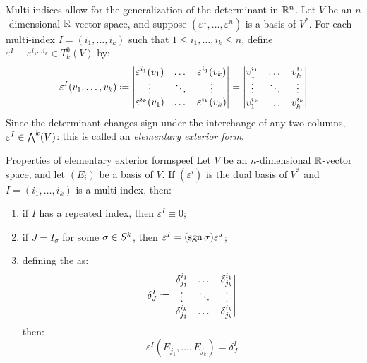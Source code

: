 Multi-indices allow for the generalization of the determinant in $ \mathbb{R}^n $. Let $ V $ be an $ n $-dimensional $ \mathbb{R} $-vector space, and suppose $ (\varepsilon^1 , \dots , \varepsilon^n) $ is a basis of $ V^* $. For each multi-index $ I = (i_1 , \dots , i_k) $ such that $ 1 \leq i_1 , \dots , i_k \leq n $, define $ \varepsilon^I \equiv \varepsilon^{i_1 \dots i_k} \in T^0_k(V) $ by:
\begin{equation}
  \varepsilon^I(v_1 , \dots , v_k) \defeq
  \begin{vmatrix}
    \varepsilon^{i_1}(v_1) & \dots & \varepsilon^{i_1}(v_k) \\
    \vdots & \ddots & \vdots \\
    \varepsilon^{i_k}(v_1) & \dots & \varepsilon^{i_k}(v_k)
  \end{vmatrix}
  =
  \begin{vmatrix}
    v_1^{i_1} & \dots & v_k^{i_1} \\
    \vdots & \ddots & \vdots \\
    v_1^{i_k} & \dots & v_k^{i_k}
  \end{vmatrix}
\end{equation}
Since the determinant changes sign under the interchange of any two columns, $ \varepsilon^I \in {\bigwedge}^{k}(V) $: this is called an \emph{elementary exterior form}.

\begin{lemma}{Properties of elementary exterior forms}{peef}
  Let $ V $ be an $ n $-dimensional $ \mathbb{R} $-vector space, and let $ (E_i) $ be a basis of $ V $. If $ (\varepsilon^i) $ is the dual basis of $ V^* $ and $ I = (i_1 , \dots , i_k) $ is a multi-index, then:
  \begin{enumerate}
    \item \label{item:peef-1} if $ I $ has a repeated index, then $ \varepsilon^I \equiv 0 $;
    \item \label{item:peef-2} if $ J = I_\sigma $ for some $ \sigma \in S^{k} $, then $ \varepsilon^I = (\mathrm{sgn}\,\sigma) \varepsilon^J $;
    \item \label{item:peef-3} defining the  as:
      \begin{equation}
        \delta^I_J \defeq
        \begin{vmatrix}
          \delta^{i_1}_{j_1} & \dots & \delta^{i_1}_{j_k} \\
          \vdots & \ddots & \vdots \\
          \delta^{i_k}_{j_1} & \dots & \delta^{i_k}_{j_k}
        \end{vmatrix}
      \end{equation}
      then:
      \begin{equation}
        \varepsilon^I(E_{j_1} , \dots , E_{j_k}) = \delta^I_J
      \end{equation}
  \end{enumerate}
\end{lemma}

